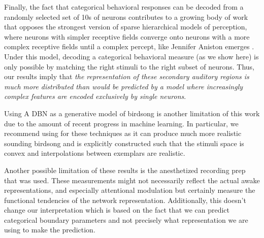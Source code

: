 Finally, the fact that categorical behavioral responses can be decoded from a randomly selected set of 10s of neurons contributes to a growing body of work \cite{jeanne2011emergence,kozlov2016central} that opposes the strongest version of sparse hierarchical models of perception, where neurons with simpler receptive fields converge onto neurons with a more complex receptive fields until a complex percept, like Jennifer Aniston emerges \cite{quiroga2005invariant}. Under this model, decoding a categorical behavioral measure (as we show here) is only possible by matching the right stimuli to the right subset of neurons. Thus, our results imply that \emph{the representation of these secondary auditory regions is much more distributed than would be predicted by a model where increasingly complex features are encoded exclusively by single neurons}.

Using A DBN as a generative model of birdsong is another limitation of this work due to the amount of recent progress in machine learning. In particular, we recommend using \cite{GAIA} for these techniques as it can produce much more realistic sounding birdsong and is explicitly constructed such that the stimuli space is convex and interpolations between exemplars are realistic.


Another possible limitation of these results is the anesthetized recording prep that was used. These measurements might not necessarily reflect the actual awake representations, and especially attentional modulation but certainly measure the functional tendencies of the network representation. Additionally, this doesn't change our interpretation which is based on the fact that we can predict categorical boundary parameters and not precisely what representation we are using to make the prediction.


